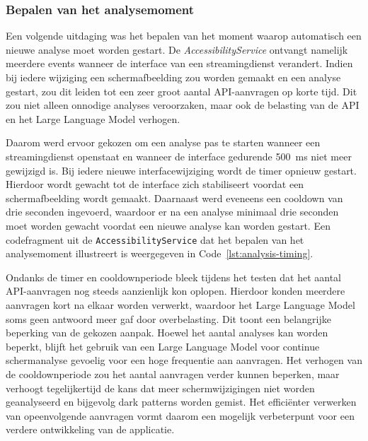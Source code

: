 \vspace{1em}

\subsubsection{Bepalen van het analysemoment}

\vspace{1em}

Een volgende uitdaging was het bepalen van het moment waarop automatisch een nieuwe analyse moet worden gestart. De \textit{AccessibilityService} ontvangt namelijk meerdere events wanneer de interface van een streamingdienst verandert. Indien bij iedere wijziging een schermafbeelding zou worden gemaakt en een analyse gestart, zou dit leiden tot een zeer groot aantal API-aanvragen op korte tijd. Dit zou niet alleen onnodige analyses veroorzaken, maar ook de belasting van de API en het Large Language Model verhogen.

\vspace{1em}

Daarom werd ervoor gekozen om een analyse pas te starten wanneer een streamingdienst openstaat en wanneer de interface gedurende 500~ms niet meer gewijzigd is. Bij iedere nieuwe interfacewijziging wordt de timer opnieuw gestart. Hierdoor wordt gewacht tot de interface zich stabiliseert voordat een schermafbeelding wordt gemaakt. Daarnaast werd eveneens een cooldown van drie seconden ingevoerd, waardoor er na een analyse minimaal drie seconden moet worden gewacht voordat een nieuwe analyse kan worden gestart. Een codefragment uit de \texttt{AccessibilityService} dat het bepalen van het analysemoment illustreert is weergegeven in Code~\ref{lst:analysis-timing}.

\vspace{1em}

Ondanks de timer en cooldownperiode bleek tijdens het testen dat het aantal API-aanvragen nog steeds aanzienlijk kon oplopen. Hierdoor konden meerdere aanvragen kort na elkaar worden verwerkt, waardoor het Large Language Model soms geen antwoord meer gaf door overbelasting. Dit toont een belangrijke beperking van de gekozen aanpak. Hoewel het aantal analyses kan worden beperkt, blijft het gebruik van een Large Language Model voor continue schermanalyse gevoelig voor een hoge frequentie aan aanvragen. Het verhogen van de cooldownperiode zou het aantal aanvragen verder kunnen beperken, maar verhoogt tegelijkertijd de kans dat meer schermwijzigingen niet worden geanalyseerd en bijgevolg dark patterns worden gemist. Het efficiënter verwerken van opeenvolgende aanvragen vormt daarom een mogelijk verbeterpunt voor een verdere ontwikkeling van de applicatie.

